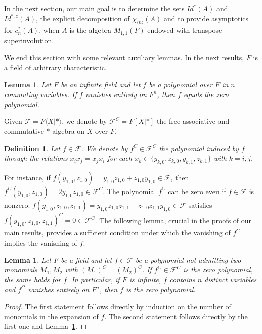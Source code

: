 \documentclass[10pt,a4paper]{amsart}
\newtheorem{lemma}[theorem]{Lemma}
\newtheorem{definition}[theorem]{Definition}
\begin{document}
	 
	 In the next section, our main goal is to determine the sets $Id^*(A)$ and $Id^{*,z}(A)$, the explicit decomposition of $\chi_{\langle n\rangle}(A)$ and to provide asymptotics for $c_n^{*}(A)$, when $A$ is the algebra $M_{1,1}(F)$ endowed with transpose superinvolution.
	 
	We end this section with some relevant auxiliary lemmas. In the next results, $F$ is a field of arbitrary characteristic.
	
		\begin{lemma}\label{lem:vanish}
		Let $F$ be an infinite field and let $f$ be a polynomial over $F$ in $n$ commuting variables. If $f$ vanishes entirely on $F^n$, then $f$ equals the zero polynomial.
	\end{lemma}
	
	Given $\mathcal{F}=F \langle X|* \rangle$, we denote by $\mathcal{F}^C=F[X|*]$ the free associative and commutative $*$-algebra on $X$ over $F$.
	
	\begin{definition}
		
		Let $f\in \mathcal{F}$. We denote by $f^C\in \mathcal{F}^C$ the polynomial induced by $f$ through the relations $x_ix_j=x_jx_i$ for each $x_k\in\{y_{k,0},z_{k,0},y_{k,1},z_{k,1}\}$ with  $k=i,j$.
	\end{definition}
	For instance, if $f(y_{1,0}, z_{1,0})=y_{1,0}z_{1,0}+z_{1,0}y_{1,0}\in \mathcal{F}$, then $f^C(y_{1,0}, z_{1,0})=2y_{1,0}z_{1,0}\in \mathcal{F}^C$. The polynomial $f^C$ can be zero even if $f\in \mathcal F$ is nonzero: $f(y_{1, 0}, z_{1, 0}, z_{1, 1})=y_{1,0}z_{1,0}z_{1, 1}-z_{1,0}z_{1, 1}y_{1,0}\in \mathcal F$ satisfies $f(y_{1, 0}, z_{1, 0}, z_{1, 1})^C=0\in \mathcal F^C$. The following lemma, crucial in the proofs of our main results, provides a sufficient condition under which the vanishing of $f^C$ implies the vanishing of $f$.
	
\begin{lemma}\label{lem:com}
		Let $F$ be a field and let $f\in \mathcal{F}$ be a polynomial not admitting two monomials $M_1, M_2$ with $(M_1)^C=(M_2)^C$. If $f^C\in \mathcal{F}^C$ is the zero polynomial, the same holds for 
		$f$. In particular, if $F$ is infinite, $f$ contains $n$ distinct variables and $f^C$ vanishes entirely on $F^n$, then $f$ is the zero polynomial.
	\end{lemma}
	\begin{proof}
		The first statement follows directly by induction on the number of monomials in the expansion of $f$. The second statement follows directly by the first one and Lemma~\ref{lem:vanish}.
	\end{proof}
	
\end{document}
